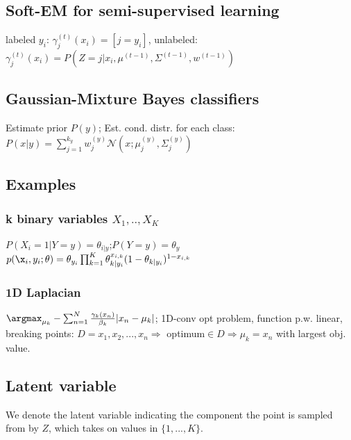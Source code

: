  \subsection*{Soft-EM for semi-supervised learning}
labeled $y_i$: $\gamma_j^{(t)}(x_i) = [j = y_i]$,
unlabeled:\\ $\gamma_j^{(t)}(x_i) = P(Z=j|x_i, \mu^{(t-1)}, \Sigma^{(t-1)}, w^{(t-1)})$
\subsection*{Gaussian-Mixture Bayes classifiers}
Estimate prior $P(y)$; Est. cond. distr. for each class:
$P(x|y) = \sum_{j=1}^{k_y} w_j^{(y)} \mathcal{N}(x; \mu_j^{(y)}, \Sigma_j^{(y)})$\\
\subsection*{Examples}
\subsubsection*{k binary variables $X_1,..,X_K$}
$P(X_i=1|Y=y)=\theta_{i|y}$;$P(Y=y)=\theta_y$
$p(\x_i,y_i;\theta)=\theta_{y_i}\prod_{k=1}^K\theta_{k|y_i}^{x_{i,k}}(1-\theta_{k|y_i})^{1-x_{i,k}}$

\subsubsection*{1D Laplacian}
$\argmax_{\mu_k}-\sum_{n=1}^N\frac{\gamma_k(x_n)}{\beta_k}|x_n-\mu_k|$; 1D-conv opt problem, function p.w. linear,
breaking points: $D=x_1,x_2,...,x_n$$\Rightarrow$ optimum$\in D \Rightarrow \mu_k=x_n$ with largest obj. value.

\subsection*{Latent variable}
We denote the latent variable indicating the component the point is sampled from by $Z$, which takes on values in $\{1,...,K\}$.
